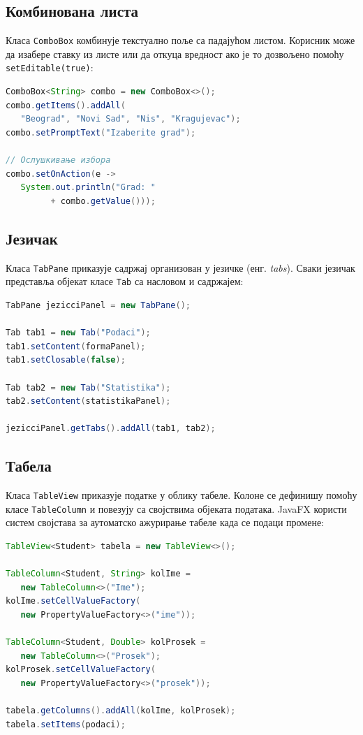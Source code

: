 \subsection{Комбинована листа}

Класа \texttt{ComboBox} комбинује текстуално поље са падајућом листом. Корисник може да изабере ставку из листе или да откуца вредност ако је то дозвољено помоћу \texttt{setEditable(true)}:


\begin{lstlisting}[language=Java]
ComboBox<String> combo = new ComboBox<>();
combo.getItems().addAll(
   "Beograd", "Novi Sad", "Nis", "Kragujevac");
combo.setPromptText("Izaberite grad");
 
// Ослушкивање избора
combo.setOnAction(e ->
   System.out.println("Grad: "
         + combo.getValue()));
\end{lstlisting}


\subsection{Језичак}

Класа \texttt{TabPane} приказује садржај организован у језичке (енг. \textit{tabs}). Сваки језичак представља објекат класе \texttt{Tab} са насловом и садржајем:


\begin{lstlisting}[language=Java]
TabPane jezicciPanel = new TabPane();
 
Tab tab1 = new Tab("Podaci");
tab1.setContent(formaPanel);
tab1.setClosable(false);
 
Tab tab2 = new Tab("Statistika");
tab2.setContent(statistikaPanel);
 
jezicciPanel.getTabs().addAll(tab1, tab2);
\end{lstlisting}


\subsection{Табела}

Класа \texttt{TableView} приказује податке у облику табеле. Колоне се дефинишу помоћу класе \texttt{TableColumn} и повезују са својствима објеката података. JavaFX користи систем својстава за аутоматско ажурирање табеле када се подаци промене:


\begin{lstlisting}[language=Java]
TableView<Student> tabela = new TableView<>();
 
TableColumn<Student, String> kolIme =
   new TableColumn<>("Ime");
kolIme.setCellValueFactory(
   new PropertyValueFactory<>("ime"));
 
TableColumn<Student, Double> kolProsek =
   new TableColumn<>("Prosek");
kolProsek.setCellValueFactory(
   new PropertyValueFactory<>("prosek"));
 
tabela.getColumns().addAll(kolIme, kolProsek);
tabela.setItems(podaci);
\end{lstlisting}


